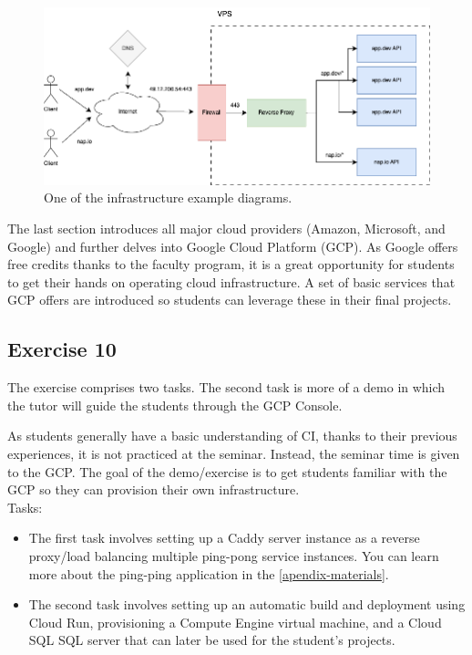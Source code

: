 \documentclass[
  digital,
  color,
  oneside,
  nosansbold,
  nocolorbold,
  nolof,
  nolot,
]{fithesis4}
\begin{document}
\begin{figure}[H]
    \centering
    \includegraphics[width=12cm]{figures/infrastructure.png}
    \caption{One of the infrastructure example diagrams.}
    \label{fig:infra}
\end{figure}

The last section introduces all major cloud providers (Amazon, Microsoft, and Google) and further delves into Google Cloud Platform (GCP)\cite{gcp}. As Google offers free credits thanks to the faculty program\cite{gcp-faculty}, it is a great opportunity for students to get their hands on operating cloud infrastructure. A set of basic services that GCP offers are introduced so students can leverage these in their final projects.

\subsection{Exercise 10}\label{exercise-10}

The exercise comprises two tasks. The second task is more of a demo in which the tutor will guide the students through the GCP Console.

As students generally have a basic understanding of CI, thanks to their previous experiences, it is not practiced at the seminar. Instead, the seminar time is given to the GCP. The goal of the demo/exercise is to get students familiar with the GCP so they can provision their own infrastructure. \\

\noindent
Tasks:
\begin{itemize}
    \item The first task involves setting up a Caddy server instance as a reverse proxy/load balancing multiple ping-pong service instances. You can learn more about the ping-ping application in the \cref{apendix-materials}.
    \item The second task involves setting up an automatic build and deployment using Cloud Run\cite{gcp-cloud-run}, provisioning a Compute Engine\cite{gcp-cloud-compute} virtual machine, and a Cloud SQL SQL\cite{gcp-cloud-sql} server that can later be used for the student's projects.
\end{itemize}
    
\end{document}
